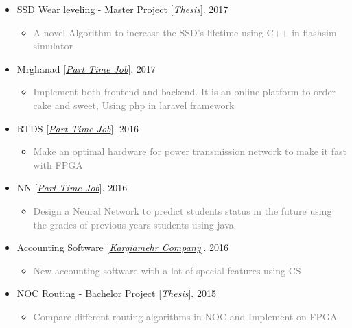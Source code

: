 \documentclass[10pt,a4paper,sans]{moderncv} %
\begin{document}
\begin{itemize}
		\item SSD Wear leveling - Master Project [\href{https://sbu.ac.ir/Cols/CSE/Pages/default.aspx/}{\emph{Thesis}}]. \hfill 2017
		\begin{itemize}
			\item \textcolor{gray} {A novel Algorithm to increase the SSD’s lifetime using C++ in flashsim simulator}
		\end{itemize}

		\item Mrghanad [\href{mailto:ma.mohammadizadeh@gmail.com}{\emph{Part Time Job}}]. \hfill 2017
		\begin{itemize}
			\item \textcolor{gray} {Implement both frontend and backend. It is an online platform to order cake and sweet, Using php in laravel framework}
		\end{itemize}

		\item RTDS [\href{mailto:ma.mohammadizadeh@gmail.com}{\emph{Part Time Job}}]. \hfill 2016
		\begin{itemize}
			\item \textcolor{gray} {Make an optimal hardware for power transmission network to make it fast with FPGA}
		\end{itemize}

		\item NN [\href{mailto:ma.mohammadizadeh@gmail.com}{\emph{Part Time Job}}]. \hfill 2016
		\begin{itemize}
			\item \textcolor{gray} {Design a Neural Network to predict students status in the future using the grades of previous years students using java}
		\end{itemize}

		\item Accounting Software [\href{http://#/}{\emph{Kargiamehr Company}}]. \hfill 2016
		\begin{itemize}
			\item \textcolor{gray} {New accounting software with a lot of special features using CS}
		\end{itemize}

		\item NOC Routing - Bachelor Project [\href{https://sbu.ac.ir/Cols/CSE/Pages/default.aspx/}{\emph{Thesis}}]. \hfill 2015
		\begin{itemize}
			\item \textcolor{gray} {Compare different routing algorithms in NOC and Implement on FPGA}
		\end{itemize}


\end{itemize}
\end{document}

